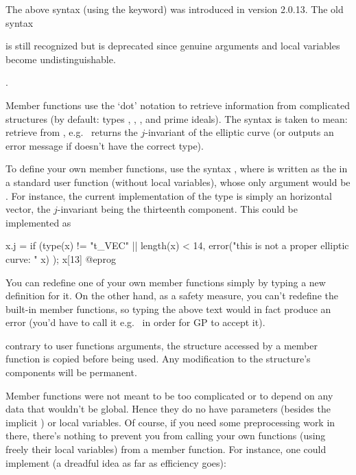  The above syntax (using the  keyword) was
introduced in version 2.0.13. The old syntax

%

\noindent is still recognized but is deprecated since genuine arguments and
local variables become undistinguishable.

.

Member functions use the `dot' notation to retrieve information from
complicated structures (by default: types , , ,
 and prime ideals). The syntax  is taken to
mean: retrieve  from , e.g.~ returns
the $j$-invariant of the elliptic curve  (or outputs an error
message if  doesn't have the correct type).

To define your own member functions, use the syntax , where  is written as the  in a
standard user function (without local variables), whose only argument would
be . For instance, the current implementation of the
 type is simply an horizontal vector, the $j$-invariant being the
thirteenth component. This could be implemented as

\bprog
x.j =
{
  if (type(x) != "t_VEC" || length(x) < 14,
    error("this is not a proper elliptic curve: " x)
  );
  x[13]
}
@eprog

You can redefine one of your own member functions simply by typing a new
definition for it. On the other hand, as a safety measure, you can't redefine
the built-in member functions, so typing the above text would in fact produce
an error (you'd have to call it e.g.~ in order for GP to accept it).

 contrary to user functions arguments, the structure
accessed by a member function is  copied before being used.
Any modification to the structure's components will be permanent.

 Member functions were not meant to be too complicated or to
depend on any data that wouldn't be global. Hence they do no have parameters
(besides the implicit ) or local variables. Of course, if you
need some preprocessing work in there, there's nothing to prevent you from
calling your own functions (using freely their local variables) from a member
function. For instance, one could implement (a dreadful idea as far as
efficiency goes):

